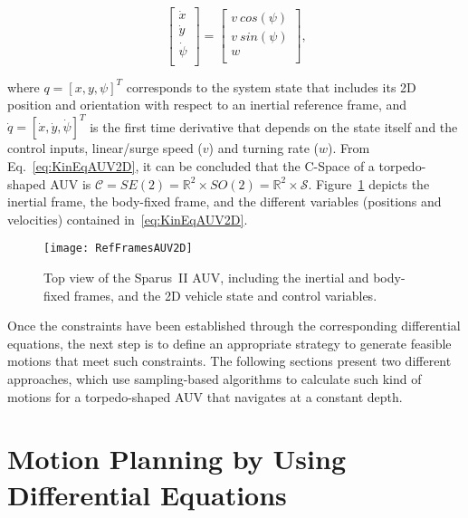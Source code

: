 \begin{equation}
\label{eq:KinEqAUV2D}
	\begin{bmatrix}
		\dot{x}\\
		\dot{y}\\
		\dot{\psi}\\
	\end{bmatrix}=
	\begin{bmatrix}
		v\ cos\left(\psi\right) \\
		v\ sin\left(\psi\right)\\
		w\\
	\end{bmatrix}
	\text{,}
\end{equation}

where $q=\left[x, y, \psi\right]^T$ corresponds to the system state that
includes its \ac{2D} position and orientation with respect to an inertial
reference frame, and $\dot{q}=\left[\dot{x}, \dot{y}, \dot{\psi}\right]^T$ is
the first time derivative that depends on the state itself and the control
inputs, \ie linear/surge speed ($v$) and turning rate ($w$). From
Eq.~\eqref{eq:KinEqAUV2D}, it can be concluded that the \ac{C-Space} of a
torpedo-shaped \ac{AUV} is $\mathcal{C} = SE(2) = \mathbb{R}^2 \times SO(2) =
\mathbb{R}^2 \times \mathcal{S}$. Figure~\ref{fig:RefFramesAUV2D} depicts the
inertial frame, the body-fixed frame, and the different variables (positions and
velocities) contained in~\eqref{eq:KinEqAUV2D}.

\begin{figure}[htbp]
	\centering
	\texttt{[image: RefFramesAUV2D]} \quad
	\caption[Top view of the Sparus~II AUV, including the inertial and body-fixed
	frames, and the 2D vehicle state and control variables.]
	{Top view of the Sparus~II AUV, including the inertial and body-fixed
	frames, and the 2D vehicle state and control variables.}
	\label{fig:RefFramesAUV2D}
\end{figure}

Once the constraints have been established through the corresponding
differential equations, the next step is to define an appropriate strategy to
generate feasible motions that meet such constraints. The following
sections present two different approaches, which use sampling-based algorithms
to calculate such kind of motions for a torpedo-shaped \ac{AUV} that navigates
at a constant depth.

\section{Motion Planning by Using Differential Equations}
\label{sec:expan_2d_diff_eq}

